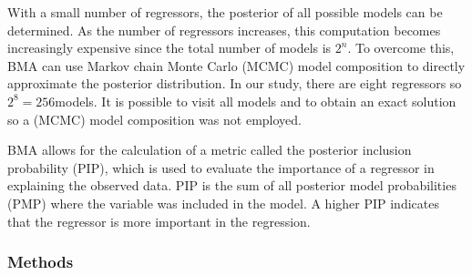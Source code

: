 \documentclass[12pt]{article}
\begin{document}
With a small number of regressors, the posterior of all possible models can be determined. As the number of regressors increases, this computation becomes increasingly expensive since the total number of models is $2^n$. To overcome this, BMA can use Markov chain Monte Carlo (MCMC) model composition to directly approximate the posterior distribution. In our study, there are eight regressors so $2^8 = 256$models. It is possible to visit all models and to obtain an exact solution so a (MCMC) model composition was not employed. 

BMA allows for the calculation of a metric called the posterior inclusion probability (PIP), which is used to evaluate the importance of a regressor in explaining the observed data. PIP is the sum of all posterior model probabilities (PMP) where the variable was included in the model. A higher PIP indicates that the regressor is more important in the regression.  

\subsubsection{Methods}
\end{document}
